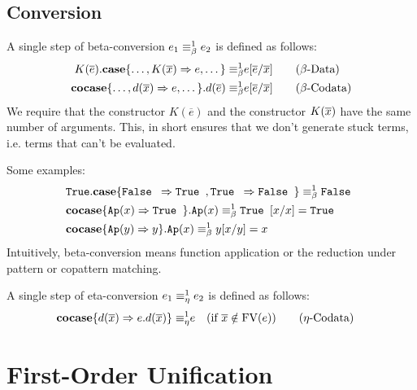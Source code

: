 \documentclass[twoside,12pt,a4paper]{article}
\begin{document}
\subsection{Conversion}


\begin{definition}
    A single step of beta-conversion $e_1 \equiv_{\beta}^1 e_2$ is defined as follows:
    \begin{align*}
        K(\overline{e}).\textbf{case}\{\dots,K(\overline{x})\Rightarrow e,\dots\} 
        \equiv_{\beta}^1 & e[\overline{e}/\overline{x}] \tag{$\beta$-Data}\\
        \textbf{cocase}\{\dots,d(\overline{x}) \Rightarrow e, \dots\}.d(\overline{e})
        \equiv_{\beta}^1 & e[\overline{e}/\overline{x}]  \tag{$\beta$-Codata}
    \end{align*}
    We require that the constructor $K(\overline{e})$ and the constructor $K(\overline{x})$ have the same number of arguments.
    This, in short ensures that we don't generate stuck terms, i.e. terms that can't be evaluated. %
\end{definition}
Some examples:
\begin{align*}
    &\texttt{True}.\textbf{case}\{\texttt{False }\Rightarrow \texttt{True }, \texttt{True } \Rightarrow \texttt{False }\}\equiv_{\beta}^1\texttt{False }\\
    &\textbf{cocase}\{\texttt{Ap}(x)\Rightarrow \texttt{True }\}.\texttt{Ap}(x)\equiv_{\beta}^1 \texttt{True }[x/x] = \texttt{True } \\
    &\textbf{cocase}\{\texttt{Ap}(y)\Rightarrow y\}.\texttt{Ap}(x) \equiv_{\beta}^1 y[x/y]= x
\end{align*}
Intuitively, beta-conversion means function application or the reduction under pattern or copattern matching. %

\begin{definition}
    A single step of eta-conversion $e_1 \equiv_{\eta}^1 e_2$ is defined as follows:
    \begin{align*}
        \textbf{cocase}\{d(\overline{x})\Rightarrow e.d(\overline{x})\} 
        \equiv_{\eta}^1 & e \quad (\text{if } \overline{x}\notin \text{FV}(e)) \tag{$\eta$-Codata}
    \end{align*}
\end{definition}

\section{First-Order Unification}
\end{document}
